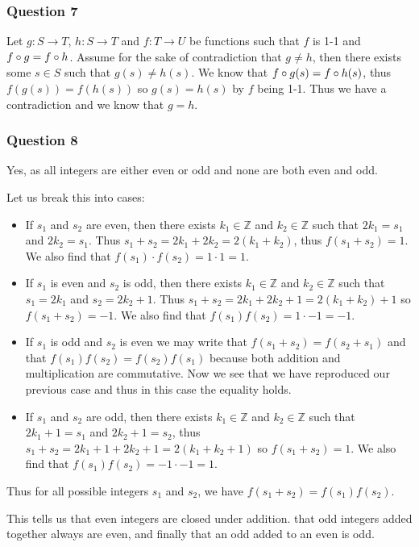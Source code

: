 \documentclass{article}
\begin{document}
\subsubsection{Question 7}
Let $g:S\to T$, $h:S\to T$ and $f:T\to U$ be functions such that $f$ is 1-1 and $f\circ g = f\circ h$. Assume for the sake of contradiction that $g\not=h$, then there exists some $s \in S$ such that $g(s) \not= h(s)$. We know that $f\circ g(s) = f\circ h(s)$, thus $f(g(s)) = f(h(s))$ so $g(s) = h(s)$ by $f$ being 1-1. Thus we have a contradiction and we know that $g=h$.

\subsubsection{Question 8}
 Yes, as all integers are either even or odd and none are both even and odd.

 Let us break this into cases:
\begin{itemize}
	\item If $s_1$ and $s_2$ are even, then there exists $k_1\in\mathbb Z$ and $k_2\in\mathbb Z$ such that $2k_1 = s_1$ and $2k_2 = s_1$. Thus $s_1 + s_2 = 2k_1 + 2k_2 = 2(k_1 + k_2)$, thus $f(s_1 + s_2) = 1$. We also find that $f(s_1) \cdot f(s_2) = 1 \cdot 1 = 1$.
	\item If $s_1$ is even and $s_2$ is odd, then there exists $k_1\in\mathbb Z$ and $k_2\in\mathbb Z$ such that $s_1 = 2k_1$ and $s_2 = 2k_2 + 1$. Thus $s_1 + s_2 = 2k_1 + 2k_2 + 1 = 2(k_1 + k_2) + 1$ so $f(s_1 + s_2) = -1$. We also find that $f(s_1) f(s_2) = 1\cdot -1 = -1$.
	\item If $s_1$ is odd and $s_2$ is even we may write that $f(s_1 + s_2) = f(s_2 + s_1)$ and that $f(s_1)f(s_2) = f(s_2)f(s_1)$ because both addition and multiplication are commutative. Now we see that we have reproduced our previous case and thus in this case the equality holds.
	\item If $s_1$ and $s_2$ are odd, then there exists $k_1\in\mathbb Z$ and $k_2\in\mathbb Z$ such that $2k_1 + 1 = s_1$ and $2k_2 + 1 = s_2$, thus $s_1 + s_2 = 2k_1 + 1 + 2k_2 + 1 = 2(k_1 + k_2 + 1)$ so $f(s_1 + s_2) = 1$. We also find that $f(s_1)f(s_2) = -1\cdot -1 = 1$.
\end{itemize}
Thus for all possible integers $s_1$ and $s_2$, we have $f(s_1 + s_2) = f(s_1)f(s_2)$.

This tells us that even integers are closed under addition. that odd integers added together always are even, and finally that an odd added to an even is odd.
\end{document}
